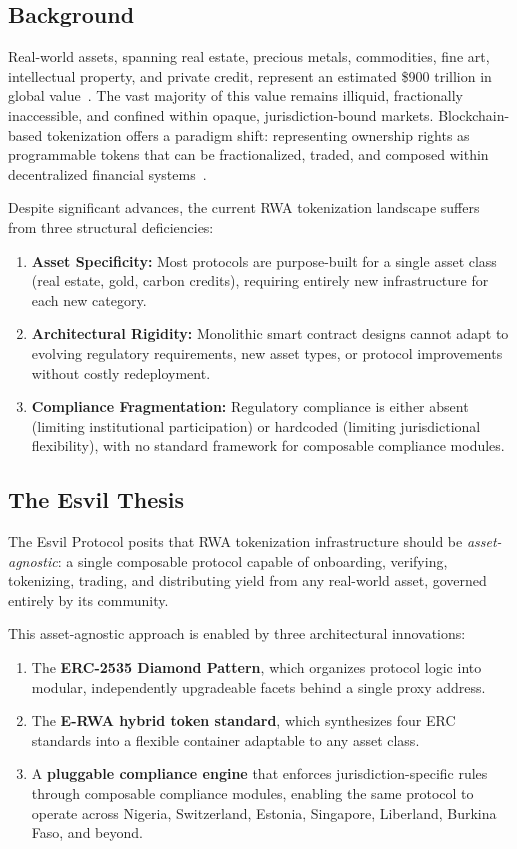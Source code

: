 \documentclass[11pt,a4paper]{article}
\begin{document}
\subsection{Background}

Real-world assets, spanning real estate, precious metals, commodities, fine art, intellectual property, and private credit, represent an estimated \$900 trillion in global value~\cite{mckinsey2024}. The vast majority of this value remains illiquid, fractionally inaccessible, and confined within opaque, jurisdiction-bound markets. Blockchain-based tokenization offers a paradigm shift: representing ownership rights as programmable tokens that can be fractionalized, traded, and composed within decentralized financial systems~\cite{zetzsche2020, schar2021}.

Despite significant advances, the current RWA tokenization landscape suffers from three structural deficiencies:

\begin{enumerate}[nosep]
    \item \textbf{Asset Specificity:} Most protocols are purpose-built for a single asset class (real estate, gold, carbon credits), requiring entirely new infrastructure for each new category.
    \item \textbf{Architectural Rigidity:} Monolithic smart contract designs cannot adapt to evolving regulatory requirements, new asset types, or protocol improvements without costly redeployment.
    \item \textbf{Compliance Fragmentation:} Regulatory compliance is either absent (limiting institutional participation) or hardcoded (limiting jurisdictional flexibility), with no standard framework for composable compliance modules.
\end{enumerate}

\subsection{The Esvil Thesis}

The Esvil Protocol posits that RWA tokenization infrastructure should be \textit{asset-agnostic}: a single composable protocol capable of onboarding, verifying, tokenizing, trading, and distributing yield from any real-world asset, governed entirely by its community.

This asset-agnostic approach is enabled by three architectural innovations:

\begin{enumerate}[nosep]
    \item The \textbf{ERC-2535 Diamond Pattern}, which organizes protocol logic into modular, independently upgradeable facets behind a single proxy address.
    \item The \textbf{E-RWA hybrid token standard}, which synthesizes four ERC standards into a flexible container adaptable to any asset class.
    \item A \textbf{pluggable compliance engine} that enforces jurisdiction-specific rules through composable compliance modules, enabling the same protocol to operate across Nigeria, Switzerland, Estonia, Singapore, Liberland, Burkina Faso, and beyond.
\end{enumerate}
\end{document}

